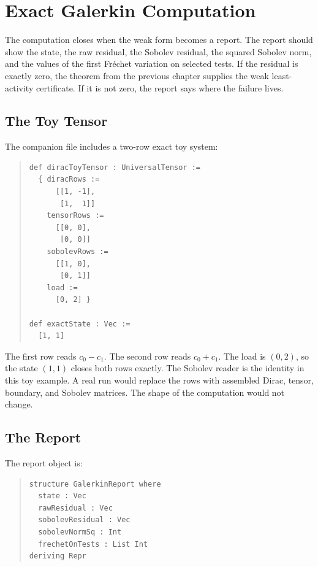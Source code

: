 \chapter{Exact Galerkin Computation}
\label{chap:exact-galerkin-computation}

The computation closes when the weak form becomes a report. The report should show the state, the raw residual,
the Sobolev residual, the squared Sobolev norm, and the values of the first Fréchet variation on selected tests.
If the residual is exactly zero, the theorem from the previous chapter supplies the weak least-activity
certificate. If it is not zero, the report says where the failure lives.

\section{The Toy Tensor}

The companion file includes a two-row exact toy system:

\begin{quote}\small
\begin{verbatim}
def diracToyTensor : UniversalTensor :=
  { diracRows :=
      [[1, -1],
       [1,  1]]
    tensorRows :=
      [[0, 0],
       [0, 0]]
    sobolevRows :=
      [[1, 0],
       [0, 1]]
    load :=
      [0, 2] }

def exactState : Vec :=
  [1, 1]
\end{verbatim}
\end{quote}

The first row reads \(c_0-c_1\). The second row reads \(c_0+c_1\). The load is \((0,2)\), so the state
\((1,1)\) closes both rows exactly. The Sobolev reader is the identity in this toy example. A real run would
replace the rows with assembled Dirac, tensor, boundary, and Sobolev matrices. The shape of the computation
would not change.

\section{The Report}

The report object is:

\begin{quote}\small
\begin{verbatim}
structure GalerkinReport where
  state : Vec
  rawResidual : Vec
  sobolevResidual : Vec
  sobolevNormSq : Int
  frechetOnTests : List Int
deriving Repr
\end{verbatim}
\end{quote}

